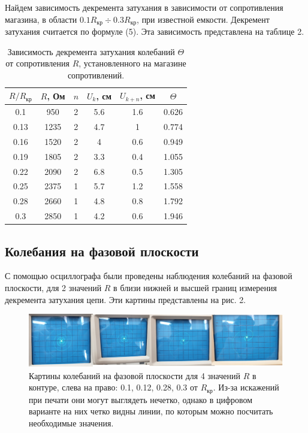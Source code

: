 \documentclass[a4paper, 14pt]{extarticle}%
\newcommand\ECaption[1]{%
     \captionsetup{font=footnotesize}%
     \caption{#1}}
\begin{document}
Найдем зависимость декремента затухания в зависимости от сопротивления магазина, в области $0.1R_{\text{кр}}\div0.3R_{\text{кр}}$, при известной емкости. Декремент затухания считается по формуле (5). Эта зависимость представлена на таблице 2.

\begin{table}[h!]
\begin{center}
\begin{tabular}{|c|c|c|c|c|c|}
\hline
\rowcolor[HTML]{9698ED} 
$R/R_{\text{кр}}$ & $R$, Ом & $n$ & $U_k$, см & $U_{k+n}$, см & $\Theta$ \\ \hline
0.1              & 950  & 2   & 5.6   & 1.6       & 0.626    \\ \hline
\rowcolor[HTML]{9698ED} 
0.13             & 1235 & 2   & 4.7   & 1         & 0.774    \\ \hline
0.16             & 1520 & 2   & 4     & 0.6       & 0.949    \\ \hline
\rowcolor[HTML]{9698ED} 
0.19             & 1805 & 2   & 3.3   & 0.4       & 1.055    \\ \hline
0.22             & 2090 & 2   & 6.8   & 0.5       & 1.305    \\ \hline
\rowcolor[HTML]{9698ED} 
0.25             & 2375 & 1   & 5.7   & 1.2       & 1.558    \\ \hline
0.28             & 2660 & 1   & 4.8   & 0.8       & 1.792    \\ \hline
\rowcolor[HTML]{9698ED} 
0.3              & 2850 & 1   & 4.2   & 0.6       & 1.946    \\ \hline
\end{tabular}
\ECaption{Зависимость декремента затухания колебаний $\Theta$ от сопротивления $R$, установленного на магазине сопротивлений.}
\end{center}
\end{table}

\subsection*{Колебания на фазовой плоскости}
С помощью осциллографа были проведены наблюдения колебаний на фазовой плоскости, для 2 значений $R$ в близи нижней и высшей границ измерения декремента затухания цепи. Эти картины представлены на рис. 2.

\begin{figure}[h!]
\begin{center}
\includegraphics[width=1\textwidth]{foto1}
\end{center}
\ECaption{Картины колебаний на фазовой плоскости для 4 значений $R$ в контуре, слева на право: 0.1, 0.12, 0.28, 0.3 от $R_{\text{кр}}$. Из-за искажений при печати они могут выглядеть нечетко, однако в цифровом варианте на них четко видны линии, по которым можно посчитать необходимые значения.}
\end{figure}
\end{document}
